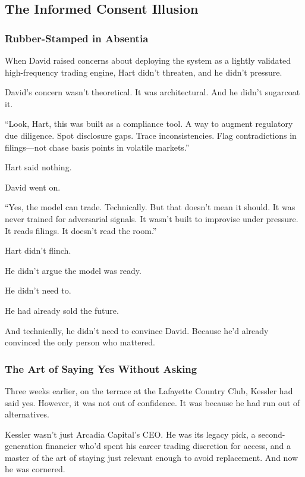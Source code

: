 
\subsection{The Informed Consent Illusion}

\subsubsection{Rubber-Stamped in Absentia}

When David raised concerns about deploying the system as a lightly validated  
high-frequency trading engine,  
Hart didn’t threaten, and he didn’t pressure.

David’s concern wasn’t theoretical.  
It was architectural.  
And he didn’t sugarcoat it.

  ``Look, Hart, this was built as a compliance tool.  
  A way to augment regulatory due diligence.  
  Spot disclosure gaps. Trace inconsistencies.  
  Flag contradictions in filings—not chase basis points in volatile markets.''

Hart said nothing.

David went on.

  ``Yes, the model can trade. Technically.  
  But that doesn’t mean it should.  
  It was never trained for adversarial signals.  
  It wasn’t built to improvise under pressure.  
  It reads filings. It doesn’t read the room.''

Hart didn’t flinch.  

He didn’t argue the model was ready.  

He didn’t need to.

He had already sold the future.

And technically, he didn’t need to convince David.  
Because he’d already convinced the only person who mattered.


\subsubsection{The Art of Saying Yes Without Asking}

Three weeks earlier, on the terrace at the Lafayette Country Club,
Kessler had said yes. However, it was not out of confidence. It was because he had run out of alternatives.

Kessler wasn’t just Arcadia Capital’s CEO. 
He was its legacy pick, a second-generation financier who’d spent his career trading discretion for access, and a master 
of the art of staying just relevant enough to avoid replacement. And now he was cornered. 


